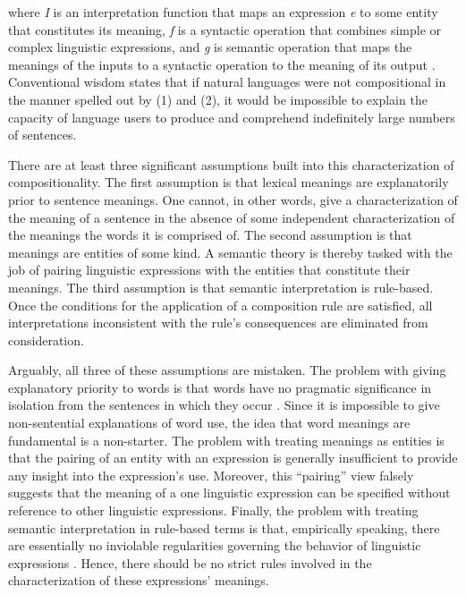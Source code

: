 \noindent
where \textit{I} is an interpretation function that maps an expression \textit{e} to some entity that constitutes its meaning, \textit{f} is a syntactic operation that combines simple or complex linguistic expressions, and \textit{g} is semantic operation that maps the meanings of the inputs to a syntactic operation to the meaning of its output \citep{Szabo:2012}. Conventional wisdom states that if natural languages were not compositional in the manner spelled out by (1) and (2), it would be impossible to explain the capacity of language users to produce and comprehend indefinitely large numbers of sentences.

There are at least three significant assumptions built into this characterization of compositionality. The first assumption is that lexical meanings are explanatorily prior to sentence meanings. One cannot, in other words, give a characterization of the meaning of a sentence in the absence of some independent characterization of the meanings the words it is comprised of. The second assumption is that meanings are entities of some kind. A semantic theory is thereby tasked with the job of pairing linguistic expressions with the entities that constitute their meanings. The third assumption is that semantic interpretation is rule-based. Once the conditions for the application of a composition rule are satisfied, all interpretations inconsistent with the rule's consequences are eliminated from consideration.   

Arguably, all three of these assumptions are mistaken. The problem with giving explanatory priority to words is that words have no pragmatic significance in isolation from the sentences in which they occur \citep{Brandom:1994}. Since it is impossible to give non-sentential explanations of word use, the idea that word meanings are fundamental is a non-starter. The problem with treating meanings as entities is that the pairing of an entity with an expression is generally insufficient to provide any insight into the expression's use. Moreover, this ``pairing'' view falsely suggests that the meaning of a one linguistic expression can be specified without reference to other linguistic expressions. Finally, the problem with treating semantic interpretation in rule-based terms is that, empirically speaking, there are essentially no inviolable regularities governing the behavior of linguistic expressions \citep{SmolenskyLegendre:2006,Manning:2015}. Hence, there should be no strict rules involved in the characterization of these expressions' meanings. 

